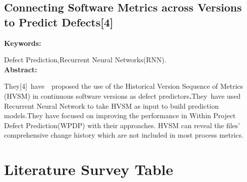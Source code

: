 \documentclass[oneside,a4paper,12pt]{book}
\begin{document}
\subsection{Connecting Software Metrics across Versions to Predict Defects[4]}

\setlength{\parskip}{0.0pt}
\textbf{Keywords:}\par

Defect Prediction,Recurrent Neural Networks(RNN).\\
\setlength{\parskip}{0.0pt}
\textbf{Abstract:}\par

\begin{justify}
\textbf{ }
They[4]\ have\ \ proposed  the  use of the Historical Version Sequence of Metrics (HVSM) in continuous software versions as defect predictors\textbf{.}They\ have used Recurrent Neural Network to take HVSM as input to build prediction models.They have focused  on improving the performance in Within Project Defect Prediction(WPDP) with their approaches. HVSM can reveal the ﬁles’ comprehensive change history which are not included in most process metrics.\par
\end{justify}\par
\newpage
\section{Literature Survey Table}


\begingroup
\setlength{\tabcolsep}{10pt} %
\renewcommand{\arraystretch}{1.5} %
\end{document}
